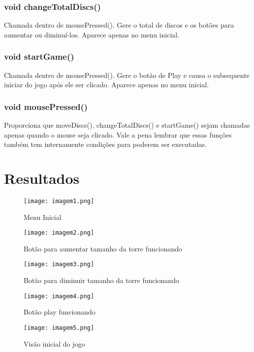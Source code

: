 \documentclass[
	12pt,				%
	oneside,			%
	a4paper,			%
	english,			%
	brazil,				%
	]{abntex2}
\begin{document}
{\subsubsection{void changeTotalDiscs()}
Chamada dentro de mousePressed(). Gere o total de discos e os botões para aumentar ou diminuí-los. Aparece apenas no menu inicial.
\subsubsection{void startGame()}
Chamada dentro de mousePressed(). Gere o botão de Play e causa o subsequente iniciar do jogo após ele ser clicado. Aparece apenas no menu inicial.
\subsubsection{void mousePressed()}
Proporciona que moveDiscs(), changeTotalDiscs() e startGame() sejam chamadas apenas quando o mouse seja clicado. Vale a pena lembrar que essas funções também tem internamente condições para poderem ser executadas.

\section{Resultados}

\begin{figure}[H]
  \centering
  \texttt{[image: imagem1.png]}
  \caption{Menu Inicial}
\end{figure}

\begin{figure}[H]
  \centering
  \texttt{[image: imagem2.png]}
  \caption{Botão para aumentar tamanho da torre funcionando}
\end{figure}

\begin{figure}[H]
  \centering
  \texttt{[image: imagem3.png]}
  \caption{Botão para diminuir tamanho da torre funcionando}
\end{figure}

\begin{figure}[H]
  \centering
  \texttt{[image: imagem4.png]}
  \caption{Botão play funcionando}
\end{figure}

\begin{figure}[H]
  \centering
  \texttt{[image: imagem5.png]}
  \caption{Visão inicial do jogo}
\end{figure}

}
\end{document}
